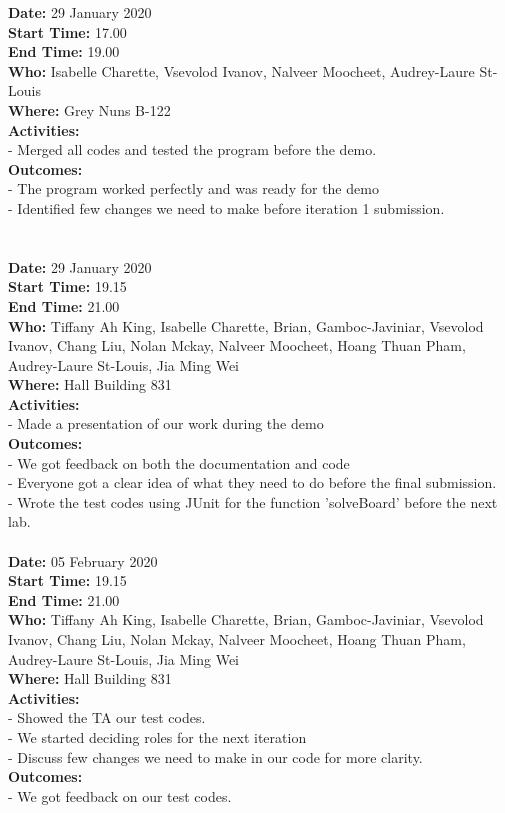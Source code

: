 \documentclass[12pt]{article}
\begin{document}
{\bf Date:} 29 January 2020 \\
{\bf Start Time:} 17.00 \\
{\bf End Time:} 19.00 \\
{\bf Who:} Isabelle Charette, Vsevolod Ivanov, Nalveer Moocheet, Audrey-Laure St-Louis \\
{\bf Where:} Grey Nuns B-122 \\
{\bf Activities:}\\
- Merged all codes and tested the program before the demo.\\
{\bf Outcomes:}\\
- The program worked perfectly and was ready for the demo\\
- Identified few changes we need to make before iteration 1 submission.\\
\\
\\
{\bf Date:} 29 January 2020 \\
{\bf Start Time:} 19.15 \\
{\bf End Time:} 21.00 \\
{\bf Who:} Tiffany Ah King, Isabelle Charette, Brian, Gamboc-Javiniar, Vsevolod Ivanov, Chang Liu, Nolan Mckay, Nalveer Moocheet, Hoang Thuan Pham, Audrey-Laure St-Louis, Jia Ming Wei \\
{\bf Where:} Hall Building 831 \\
{\bf Activities:}\\
- Made a presentation of our work during the demo\\
{\bf Outcomes:}\\
- We got feedback on both the documentation and code\\
- Everyone got a clear idea of what they need to do before the final submission.\\
- Wrote the test codes using JUnit for the function 'solveBoard' before the next lab.
\\
\\
{\bf Date:} 05 February 2020 \\
{\bf Start Time:} 19.15 \\
{\bf End Time:} 21.00 \\
{\bf Who:} Tiffany Ah King, Isabelle Charette, Brian, Gamboc-Javiniar, Vsevolod Ivanov, Chang Liu, Nolan Mckay, Nalveer Moocheet, Hoang Thuan Pham, Audrey-Laure St-Louis, Jia Ming Wei \\
{\bf Where:} Hall Building 831 \\
{\bf Activities:}\\
- Showed the TA our test codes.\\
- We started deciding roles for the next iteration\\
- Discuss few changes we need to make in our code
for more clarity.\\
{\bf Outcomes:}\\
- We got feedback on our test codes.



\newpage 
\end{document}
